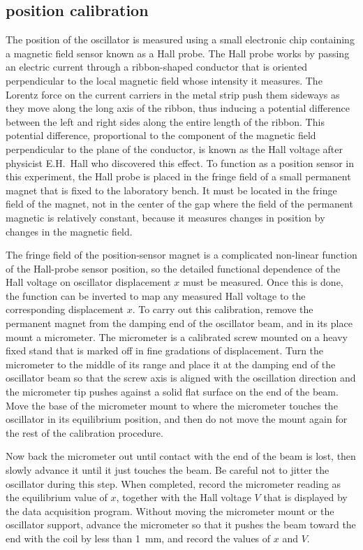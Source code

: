 \documentclass{revtex4}
\begin{document}
\subsection{position calibration}

The position of the oscillator is measured using a small electronic chip
containing a magnetic field sensor known as a Hall probe.  The Hall probe
works by passing an electric current through a ribbon-shaped conductor that
is oriented perpendicular to the local magnetic field whose intensity it
measures.  The Lorentz force on the current carriers in the metal strip
push them sideways as they move along the long axis of the ribbon, thus
inducing a potential difference between the left and right sides along the
entire length of the ribbon.  This potential difference, proportional to
the component of the magnetic field perpendicular to the plane of the
conductor, is known as the Hall voltage after physicist E.H.~Hall who
discovered this effect.  To function as a position sensor in this experiment,
the Hall probe is placed in the fringe field of a small permanent magnet
that is fixed to the laboratory bench.  It must be located in the fringe
field of the magnet, not in the center of the gap where the field of the
permanent magnetic is relatively constant, because it measures changes in
position by changes in the magnetic field.

The fringe field of the position-sensor magnet is a complicated non-linear
function of the Hall-probe sensor position, so the detailed functional
dependence of the Hall voltage on oscillator displacement $x$ must be
measured.  Once this is done, the function can be inverted to map any
measured Hall voltage to the corresponding displacement $x$.  To carry out
this calibration, remove the permanent magnet from the damping end of the
oscillator beam, and in its place mount a micrometer.  The micrometer is
a calibrated screw mounted on a heavy fixed stand that is marked off in
fine gradations of displacement.  Turn the micrometer to the middle of its
range and place it at the damping end of the oscillator beam so that the
screw axis is aligned with the oscillation direction and the micrometer tip
pushes against a solid flat surface on the end of the beam.  Move the base
of the micrometer mount to where the micrometer touches the oscillator in
its equilibrium position, and then do not move the mount again for the rest
of the calibration procedure.

Now back the micrometer out until contact
with the end of the beam is lost, then slowly advance it until it just
touches the beam.  Be careful not to jitter the oscillator during this step.
When completed, record the micrometer reading as the equilibrium value of
$x$, together with the Hall voltage $V$ that is displayed by the data
acquisition program.  Without moving the micrometer mount or the oscillator
support, advance the micrometer so that it pushes the beam toward the end
with the coil by less than 1~mm, and record the values of $x$ and $V$.
\end{document}
